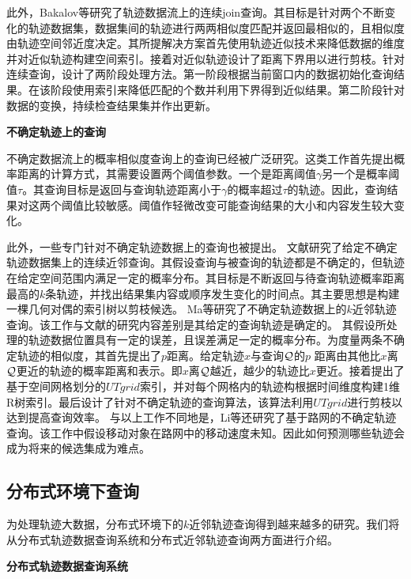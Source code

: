 此外，Bakalov等研究了轨迹数据流上的连续join查询\cite{BakalovT06}。其目标是针对两个不断变化的轨迹数据集，数据集间的轨迹进行两两相似度匹配并返回最相似的，且相似度由轨迹空间邻近度决定。其所提解决方案首先使用轨迹近似技术来降低数据的维度并对近似轨迹构建空间索引。接着对近似轨迹设计了距离下界用以进行剪枝。针对连续查询，设计了两阶段处理方法。第一阶段根据当前窗口内的数据初始化查询结果。在该阶段使用索引来降低匹配的个数并利用下界得到近似结果。第二阶段针对数据的变换，持续检查结果集并作出更新。

\textbf{不确定轨迹上的查询}

不确定数据流上的概率相似度查询上的查询已经被广泛研究\cite{LianCY08,YehWYC09}。这类工作首先提出概率距离的计算方式，其需要设置两个阈值参数。一个是距离阈值$\gamma$另一个是概率阈值$\tau$。其查询目标是返回与查询轨迹距离小于$\gamma$的概率超过$\tau$的轨迹。因此，查询结果对这两个阈值比较敏感。阈值作轻微改变可能查询结果的大小和内容发生较大变化。

此外，一些专门针对不确定轨迹数据上的查询也被提出\cite{TrajcevskiTDSC09,Trajcevski2011,Ma2013KSQ}。
文献\cite{TrajcevskiTDSC09,Trajcevski2011}研究了给定不确定轨迹数据集上的连续近邻查询。其假设查询与被查询的轨迹都是不确定的，但轨迹在给定空间范围内满足一定的概率分布。其目标是不断返回与待查询轨迹概率距离最高的$k$条轨迹，并找出结果集内容或顺序发生变化的时间点。其主要思想是构建一棵几何对偶的索引树以剪枝候选。
Ma等研究了不确定轨迹数据上的$k$近邻轨迹查询\cite{Ma2013KSQ}。该工作与文献\cite{TrajcevskiTDSC09}的研究内容差别是其给定的查询轨迹是确定的。
其假设所处理的轨迹数据位置具有一定的误差，且误差满足一定的概率分布。为度量两条不确定轨迹的相似度，其首先提出了$p$距离。给定轨迹$x$与查询$\cal Q$的$p$ 距离由其他比$x$离$\cal Q$更近的轨迹的概率距离和表示。即$x$离$\cal Q$越近，越少的轨迹比$x$更近。接着提出了基于空间网格划分的$UTgrid$索引，并对每个网格内的轨迹构根据时间维度构建1维R树索引。最后设计了针对不确定轨迹的查询算法，该算法利用$UTgrid$进行剪枝以达到提高查询效率。
与以上工作不同地是，Li等还研究了基于路网的不确定轨迹查询\cite{LiLSF11}。该工作中假设移动对象在路网中的移动速度未知。因此如何预测哪些轨迹会成为将来的候选集成为难点。

\subsection{分布式环境下查询}
为处理轨迹大数据，分布式环境下的$k$近邻轨迹查询得到越来越多的研究。我们将从分布式轨迹数据查询系统和分布式近邻轨迹查询两方面进行介绍。

\textbf{分布式轨迹数据查询系统}

